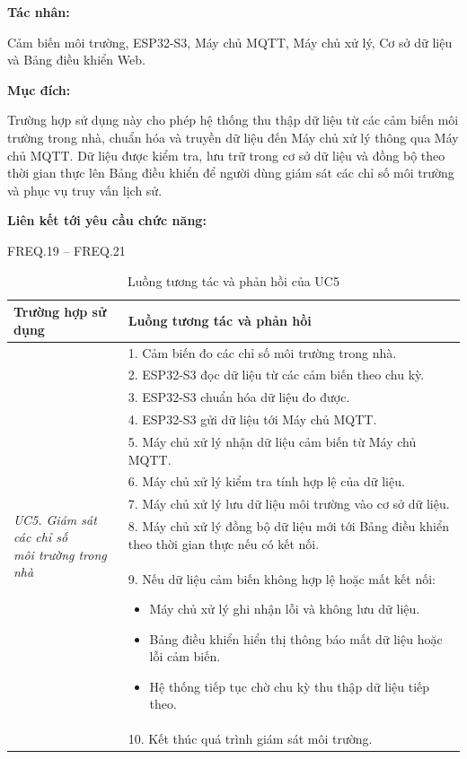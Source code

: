 \documentclass[a4paper,12pt]{article}
\begin{document}
\textbf{Tác nhân:}

Cảm biến môi trường, ESP32-S3, Máy chủ MQTT, Máy chủ xử lý, Cơ sở dữ liệu và Bảng điều khiển Web.

\textbf{Mục đích:}

Trường hợp sử dụng này cho phép hệ thống thu thập dữ liệu từ các cảm biến môi trường trong nhà, chuẩn hóa và truyền dữ liệu đến Máy chủ xử lý thông qua Máy chủ MQTT. Dữ liệu được kiểm tra, lưu trữ trong cơ sở dữ liệu và đồng bộ theo thời gian thực lên Bảng điều khiển để người dùng giám sát các chỉ số môi trường và phục vụ truy vấn lịch sử.

\textbf{Liên kết tới yêu cầu chức năng:}

FREQ.19 -- FREQ.21

\begin{table}[H]
\centering
\small
\caption{Luồng tương tác và phản hồi của UC5}
\begin{tabularx}{\linewidth}{|p{4cm}|X|}
\hline
\textbf{Trường hợp sử dụng} &
\textbf{Luồng tương tác và phản hồi} \\
\hline

\multirow{13}{=}{\parbox{3.6cm}{\centering\textit{UC5. Giám sát các chỉ số\\môi trường trong nhà}}}
&
1. Cảm biến đo các chỉ số môi trường trong nhà. \\

&
2. ESP32-S3 đọc dữ liệu từ các cảm biến theo chu kỳ. \\

&
3. ESP32-S3 chuẩn hóa dữ liệu đo được. \\

&
4. ESP32-S3 gửi dữ liệu tới Máy chủ MQTT. \\

&
5. Máy chủ xử lý nhận dữ liệu cảm biến từ Máy chủ MQTT. \\

&
6. Máy chủ xử lý kiểm tra tính hợp lệ của dữ liệu. \\

&
7. Máy chủ xử lý lưu dữ liệu môi trường vào cơ sở dữ liệu. \\

&
8. Máy chủ xử lý đồng bộ dữ liệu mới tới Bảng điều khiển theo thời gian thực nếu có kết nối. \\

&
9. Nếu dữ liệu cảm biến không hợp lệ hoặc mất kết nối:
\begin{itemize}
    \item Máy chủ xử lý ghi nhận lỗi và không lưu dữ liệu.
    \item Bảng điều khiển hiển thị thông báo mất dữ liệu hoặc lỗi cảm biến.
    \item Hệ thống tiếp tục chờ chu kỳ thu thập dữ liệu tiếp theo.
\end{itemize}
\\

&
10. Kết thúc quá trình giám sát môi trường. \\
\hline
\hline

\end{tabularx}
\end{table}
\end{document}
